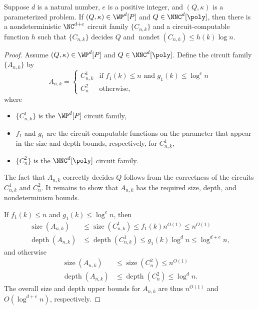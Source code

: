 \documentclass{article}
\DeclareMathOperator{\depth}{depth}
\DeclareMathOperator{\nondet}{nondet}
\DeclareMathOperator{\size}{size}
\begin{document}
\begin{theorem}\label{thm:rmparam}
  Suppose $d$ is a natural number, $e$ is a positive integer, and $(Q, \kappa)$ is a parameterized problem.
  If $(Q, \kappa) \in \WP^d[P]$ and $Q \in \NNC^d[\poly]$, then there is a nondeterministic $\NC^{d + e}$ circuit family $\{C_{n, k}\}$ and a circuit-computable function $h$ such that $\{C_{n, k}\}$ decides $Q$ and $\nondet(C_{n, k}) \leq h(k) \log n$.
\end{theorem}
\begin{proof}
  Assume $(Q, \kappa) \in \WP^d[P]$ and $Q \in \NNC^d[\poly]$.
  Define the circuit family $\{A_{n, k}\}$ by
  \[
  A_{n, k} =
  \begin{cases}
    C^1_{n, k} & \text{if } f_1(k) \leq n \text{ and } g_1(k) \leq \log^e n \\
    C^2_n & \text{otherwise},
  \end{cases}
  \]
  where
  \begin{itemize}
  \item $\{C^1_{n, k}\}$ is the $\WP^d[P]$ circuit family,
  \item $f_1$ and $g_1$ are the circuit-computable functions on the parameter that appear in the size and depth bounds, respectively, for $C^1_{n, k}$,
  \item $\{C^2_n\}$ is the $\NNC^d[\poly]$ circuit family.
  \end{itemize}
  The fact that $A_{n, k}$ correctly decides $Q$ follows from the correctness of the circuits $C^1_{n, k}$ and $C^2_n$.
  It remains to show that $A_{n, k}$ has the required size, depth, and nondeterminism bounds.

  If $f_1(k) \leq n$ and $g_1(k) \leq \log^e n$, then
  \begin{align*}
    \size(A_{n, k}) & \leq \size(C^1_{n, k}) \leq f_1(k) n^{O(1)} \leq n^{O(1)} \\
    \depth(A_{n, k}) & \leq \depth(C^1_{n, k}) \leq g_1(k) \log^d n \leq \log^{d + e} n,
  \end{align*}
  and otherwise
  \begin{align*}
    \size(A_{n, k}) & \leq \size(C^2_n) \leq n^{O(1)} \\
    \depth(A_{n, k}) & \leq \depth(C^2_n) \leq \log^d n.
  \end{align*}
  The overall size and depth upper bounds for $A_{n, k}$ are thus $n^{O(1)}$ and $O(\log^{d + e} n)$, respectively.


\end{proof}
\end{document}
